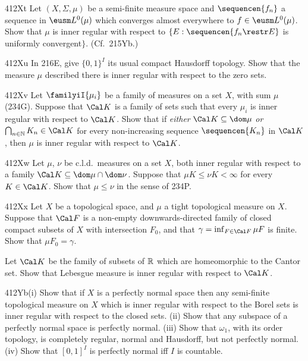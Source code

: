 {\spheader 412Xt Let $(X,\Sigma,\mu)$ be a semi-finite measure space and
$\sequencen{f_n}$ a sequence in $\eusm L^0(\mu)$ which converges almost
everywhere to $f\in\eusm L^0(\mu)$.   Show that $\mu$ is inner regular
with respect to
$\{E:\sequencen{f_n\restr E}$ is uniformly convergent$\}$.
(Cf.\ 215Yb.)

\spheader 412Xu In 216E, give $\{0,1\}^I$ its usual compact Hausdorff
topology.   Show that the measure $\mu$ described there is inner regular
with respect to the zero sets.

\spheader 412Xv Let $\familyiI{\mu_i}$ be a family of measures on a set
$X$, with sum $\mu$ (234G).   Suppose that $\Cal K$ is a
family of sets such that every $\mu_i$ is inner regular with respect to
$\Cal K$.   Show that if {\it either} $\Cal K\subseteq\dom\mu$ {\it or}
$\bigcap_{n\in\Bbb N}K_n\in\Cal K$ for every non-increasing sequence
$\sequencen{K_n}$ in $\Cal K$, then $\mu$ is inner regular with respect to
$\Cal K$.

\spheader 412Xw Let $\mu$, $\nu$ be c.l.d.\ measures on a set $X$, both
inner regular with respect to a family 
$\Cal K\subseteq\dom\mu\cap\dom\nu$.   Suppose that 
$\mu K\le\nu K<\infty$ for every $K\in\Cal K$.   Show that $\mu\le\nu$ in
the sense of 234P.

\spheader 412Xx
Let $X$ be a topological space, and $\mu$ a tight topological 
measure on $X$.   Suppose that $\Cal F$ is a 
non-empty downwards-directed family of
closed compact subsets of $X$ with intersection $F_0$, and that 
$\gamma=\inf_{F\in\Cal F}\mu F$ is finite.   Show that $\mu F_0=\gamma$.

Let $\Cal K$ be the family of subsets of $\Bbb R$ which are homeomorphic
to the Cantor set.   Show that Lebesgue measure is inner regular with
respect to $\Cal K$.   

\spheader 412Yb(i) Show that if $X$ is a perfectly normal space
then any semi-finite topological measure on $X$ which is inner
regular with respect to the Borel sets is inner regular
with respect to the closed sets.   (ii) Show that any subspace of a
perfectly normal space is perfectly normal.  (iii) Show
that $\omega_1$, with its order topology, is completely regular, normal
and Hausdorff, but
not perfectly normal.   (iv) Show that $[0,1]^I$ is perfectly normal iff
$I$ is countable.

}
